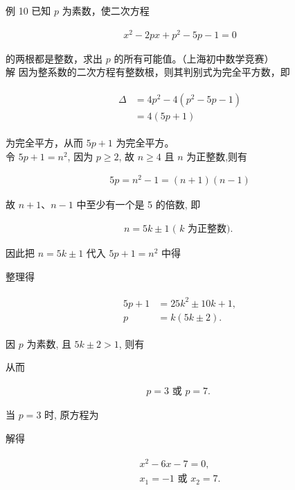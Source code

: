 \documentclass[10pt]{article}
\begin{document}
例 10 已知 $p$ 为素数，使二次方程

\begin{align*}
x^{2}-2 p x+p^{2}-5 p-1=0
\end{align*}

的两根都是整数，求出 $p$ 的所有可能值。（上海初中数学竞赛）\\
解 因为整系数的二次方程有整数根，则其判别式为完全平方数，即

\begin{align*}
\begin{aligned}
\Delta & =4 p^{2}-4\left(p^{2}-5 p-1\right) \\
& =4(5 p+1)
\end{aligned}
\end{align*}

为完全平方，从而 $5 p+1$ 为完全平方。\\
令 $5 p+1=n^{2}$, 因为 $p \geqslant 2$, 故 $n \geqslant 4$ 且 $n$ 为正整数,则有

\begin{align*}
5 p=n^{2}-1=(n+1)(n-1)
\end{align*}

故 $n+1 、 n-1$ 中至少有一个是 5 的倍数, 即

\begin{align*}
n=5 k \pm 1 \text { ( } k \text { 为正整数). }
\end{align*}

因此把 $n=5 k \pm 1$ 代入 $5 p+1=n^{2}$ 中得

整理得

\begin{align*}
\begin{aligned}
5 p+1 & =25 k^{2} \pm 10 k+1, \\
p & =k(5 k \pm 2) .
\end{aligned}
\end{align*}

因 $p$ 为素数, 且 $5 k \pm 2>1$, 则有

从而

\begin{align*}
p=3 \text { 或 } p=7 \text {. }
\end{align*}

当 $p=3$ 时, 原方程为

解得

\begin{align*}
\begin{gathered}
x^{2}-6 x-7=0, \\
x_{1}=-1 \text { 或 } x_{2}=7 .
\end{gathered}
\end{align*}
\end{document}

